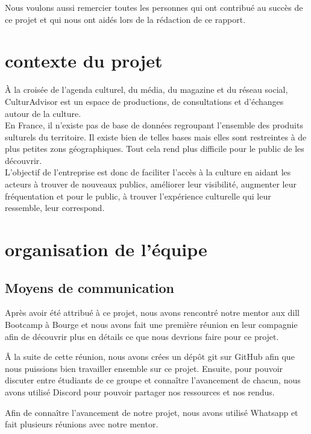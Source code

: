 \documentclass{article}
\begin{document}
Nous voulons aussi remercier toutes les personnes qui ont contribué au succès de ce projet et qui nous ont aidés lors de la rédaction de ce rapport.
\newpage
\tableofcontents
\newpage %
\section{contexte du projet}
À la croisée de l’agenda culturel, du média, du magazine et du réseau social, CulturAdvisor est un espace de productions, de consultations et d’échanges autour de la culture. \\
En France, il n'existe pas de base de données regroupant l'ensemble des produits sulturels du territoire. Il existe bien de telles bases mais elles sont restreintes à de plus petites zons géographiques. Tout cela rend plus difficile pour le public de les découvrir. \\
L'objectif de l'entreprise est donc de faciliter l’accès à la culture en aidant les acteurs à trouver de nouveaux publics, améliorer leur visibilité, augmenter leur fréquentation et pour le public, à trouver l’expérience culturelle qui leur ressemble, leur correspond.
\newpage

\section{organisation de l'équipe}

\subsection{Moyens de communication}
Après avoir été attribué à ce projet, nous avons rencontré notre mentor aux dill Bootcamp à Bourge et nous avons fait une première réunion en leur compagnie afin de découvrir plus en détails ce que
nous devrions faire pour ce projet.

Â la suite de cette réunion, nous avons crées un dépôt git sur GitHub afin que nous puissions bien travailler ensemble sur ce projet. Ensuite, pour pouvoir discuter entre étudiants de ce groupe et connaître l’avancement de chacun,
nous avons utilisé Discord pour pouvoir partager nos ressources et nos rendus.

Afin de connaître l'avancement de notre projet, nous avons utilisé Whatsapp et fait plusieurs réunions avec notre mentor.
\end{document}
